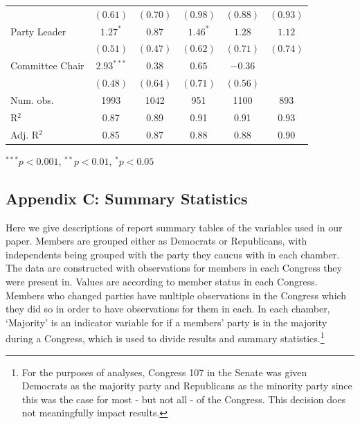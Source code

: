 \documentclass[12pt]{article}
\begin{document}
\begin{table}[H]
\begin{threeparttable}
\begin{tabular}{l c c c c c }
& $(0.61)$      & $(0.70)$     & $(0.98)$      & $(0.88)$      & $(0.93)$     \\
Party Leader                  & $1.27^{*}$    & $0.87$       & $1.46^{*}$    & $1.28$        & $1.12$       \\
& $(0.51)$      & $(0.47)$     & $(0.62)$      & $(0.71)$      & $(0.74)$     \\
Committee Chair                   & $2.93^{***}$  & $0.38$       & $0.65$        & $-0.36$       &              \\
& $(0.48)$      & $(0.64)$     & $(0.71)$      & $(0.56)$      &              \\
\hline
Num. obs.               & 1993          & 1042         & 951           & 1100          & 893          \\
R$^2$      & 0.87          & 0.89         & 0.91          & 0.91          & 0.93         \\
Adj. R$^2$ & 0.85          & 0.87         & 0.88          & 0.88          & 0.90         \\
\hline
\end{tabular}
\begin{tablenotes}
   \item
   $^{***}p<0.001$, $^{**}p<0.01$, $^*p<0.05$
 \end{tablenotes}
\end{threeparttable}
\end{table}

\clearpage

\subsection*{Appendix C: Summary Statistics}
%

Here we give descriptions of report summary tables of the variables used in our paper. Members are grouped either as Democrats or Republicans, with independents being grouped with the party they caucus with in each chamber. The data are constructed with observations for members in each Congress they were present in. Values are according to member status in each Congress. Members who changed parties have multiple observations in the Congress which they did so in order to have observations for them in each. In each chamber, `Majority' is an indicator variable for if a members' party is in the majority during a Congress, which is used to divide results and summary statistics.\footnote{\doublespacing\normalsize For the purposes of analyses, Congress 107 in the Senate was given Democrats as the majority party and Republicans as the minority party since this was the case for most - but not all - of the Congress. This decision does not meaningfully impact results.}
\end{document}
